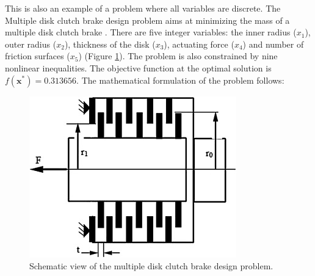 

This is also an example of a problem where all variables are discrete. The Multiple disk clutch brake design problem aims at minimizing the mass of a multiple disk clutch brake \cite{MD}. There are five integer variables: the inner radius ($x_1$), outer radius ($x_2$), thickness of the disk ($x_3$), actuating force ($x_4$) and number of friction surfaces ($x_5$) (Figure \ref{fig:MD}). The problem is also constrained by nine nonlinear inequalities. The objective function at the optimal solution is $f(\bm{x}^*) = 0.313656$. The mathematical formulation of the problem follows:

\vspace{-0.5cm}



\vspace{0.5cm}


\begin{figure}[h]
    \begin{center}
    \includegraphics[scale=0.6]{Imgs/MD.jpg}
    \end{center}
    \captionsetup{justification=centering}
    \caption{Schematic view of the multiple disk clutch brake design problem.}\label{fig:MD}
\end{figure}